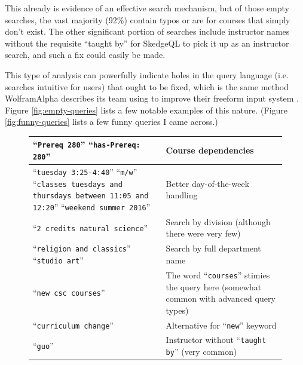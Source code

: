   This already is evidence of an effective search mechanism, but of those empty searches, the vast majority (92\%) contain typos or are for courses that simply don't exist. The other significant portion of searches include instructor names without the requisite ``taught by'' for SkedgeQL to pick it up as an instructor search, and such a fix could easily be made.

  This type of analysis can powerfully indicate holes in the query language (i.e. searches intuitive for users) that ought to be fixed, which is the same method WolframAlpha describes its team using to improve their freeform input system \cite{wolfram2}. Figure \ref{fig:empty-queries} lists a few notable examples of this nature. (Figure \ref{fig:funny-queries} lists a few funny queries I came across.)

  \begin{figure}
  {\renewcommand{\arraystretch}{1.5}
  \centering
  \begin{tabular}{ p{6cm} p{7.5cm} }
  \hline

    ``{\tt Prereq 280}'' \newline ``{\tt has-Prereq: 280}''
    & Course dependencies \\ \hline

    ``{\tt tuesday 3:25-4:40}'' \newline ``{\tt m/w}'' \newline ``{\tt classes tuesdays and thursdays between 11:05 and 12:20}'' \newline ``{\tt weekend summer 2016}''
    & \parbox[c]{\hsize}{Better day-of-the-week handling} \\ \hline

    ``{\tt 2 credits natural science}'' 
    & Search by division (although there were very few) \\ \hline

    ``{\tt religion and classics}'' \newline ``{\tt studio art}'' 
    & Search by full department name \\ \hline

    ``{\tt new csc courses}'' 
    & The word ``{\tt courses}'' stimies the query here (somewhat common with advanced query types) \\ \hline

    ``{\tt curriculum change}'' 
    & Alternative for ``{\tt new}'' keyword \\ \hline

    ``{\tt guo}'' 
    & Instructor without ``{\tt taught by}'' (very common) \\ \hline


\end{tabular}}
\end{figure}
